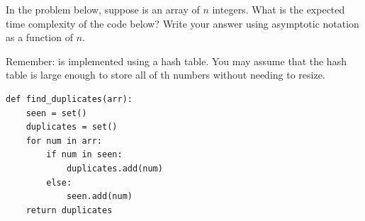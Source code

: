 \Needspace{4in}
\begin{prob}

In the problem below, suppose  is an array of $n$ integers. What is
the expected time complexity of the code below? Write your answer using
asymptotic notation as a function of $n$.

Remember:  is implemented using a hash table. You may assume that the hash
table is large enough to store all of th numbers without needing to resize.

\begin{verbatim}
def find_duplicates(arr):
    seen = set()
    duplicates = set()
    for num in arr:
        if num in seen:
            duplicates.add(num)
        else:
            seen.add(num)
    return duplicates
\end{verbatim}


\end{prob}
